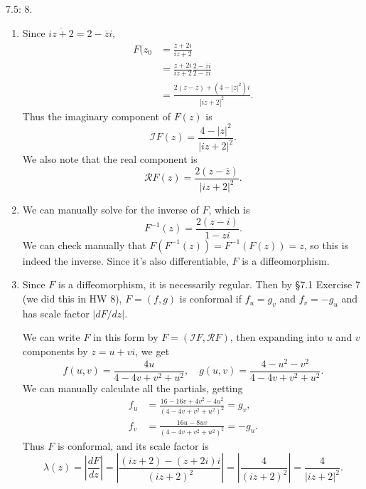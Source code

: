 \documentclass[10pt]{report}
\begin{document}
\pagebreak
\begin{exer}[]
7.5: 8.
\end{exer}
\begin{enumerate}
	\item Since $\overline{iz+2} = 2-\overline{z}i$,
		\begin{align*}
			F(z_0 &= \frac{z+2i}{iz+2} \\
			      &= \frac{z+2i}{iz+2} \frac{2-\overline{z}i}{2-\overline{z}i} \\
			      &= \frac{2(z-\overline{z}) + (4-|z|^2)i}{|iz+2|^2} .
		\end{align*}
		Thus the imaginary component of $F(z)$ is
		\[
			\mathscr{I} F(z) = \frac{4-|z|^2}{|iz+2|^2}.
		\] We also note that the real component is
		\[
			\mathscr{R} F(z) = \frac{2(z-\overline{z})}{|iz+2|^2}.
		\] 
	
	\item We can manually solve for the inverse of $F$, which is
		\[
			F^{-1}(z) = \frac{2(z-i)}{1-zi} .
		\] We can check manually that $F(F^{-1}(z)) = F^{-1}(F(z))=z$, so this is indeed the inverse. Since it's also differentiable, $F$ is a diffeomorphism.

	\item Since $F$ is a diffeomorphism, it is necessarily regular. Then by \S 7.1 Exercise 7 (we did this in HW 8), $F=(f,g)$ is conformal if $f_{u}=g_{v}$ and $f_{v}=-g_{u}$ and has scale factor $\left| dF/dz \right|$.

		We can write $F$ in this form by $F = (\mathscr{I} F, \mathscr{R} F)$, then expanding into $u$ and $v$ components by $z=u+vi$, we get
		\[
			f(u,v) = \frac{4u}{4-4v+v^2+u^2} , \quad g(u,v) = \frac{4-u^2-v^2}{4-4v+v^2+u^2} .
		\] We can manually calculate all the partials, getting
		\begin{align*}
			f_{u} &= \frac{16-16v+4v^2-4u^2}{(4-4v+v^2+u^2)^2} = g_{v},\\
			f_{v} &= \frac{16u-8uv}{(4-4v+v^2+u^2)^2} = -g_{u}.
		\end{align*}
		Thus $F$ is conformal, and its scale factor is
		\[
			\lambda(z) = \left| \frac{dF}{dz}  \right| = \left| \frac{(iz+2)-(z+2i)i}{(iz+2)^2}  \right| = \left| \frac{4}{(iz+2)^2}  \right| = \frac{4}{|iz+2|^2} .
		\] 


\end{enumerate}
\end{document}
